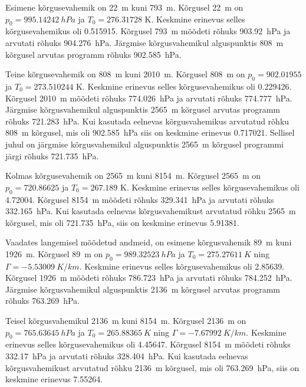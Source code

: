 \documentclass{trkut}%
\begin{document}
Esimene kõrgusevahemik on \SI{22}{m} kuni \SI{793}{m}. Kõrgusel \SI{22}{m} on $p_0=\SI{995.14242}{hPa}$ ja $T_0 = 276.31728$ K. Keskmine erinevus selles kõrgusevahemikus oli \SI{0.515915}{\permil}. Kõrgusel \SI{793}{m} mõõdeti rõhuks \SI{903.92}{hPa} ja arvutati rõhuks \SI{904.276}{hPa}. Järgmise kõrgusvahemikul alguspunktis \SI{808}{m} kõrgusel arvutas programm rõhuks \SI{902.585}{hPa}.

Teine kõrgusevahemik on \SI{808}{m} kuni \SI{2010}{m}. Kõrgusel \SI{808}{m} on $p_0 = 902.01955$ ja $T_0 = 273.510244$ K. Keskmine erinevus selles kõrgusevahemikus oli \SI{0.229426}{\permil}. Kõrgusel \SI{2010}{m} mõõdeti rõhuks \SI{774.026}{hPa} ja arvutati rõhuks \SI{774.777}{hPa}. Järgmise kõrgusvahemikul alguspunktis \SI{2565}{m} kõrgusel arvutas programm rõhuks \SI{721.283}{hPa}. Kui kasutada eelnevas kõrgusvahemikus arvutatud rõhku \SI{808}{m} kõrgusel, mis oli \SI{902.585}{hPa} siis on keskmine erinevus \SI{0.717021}{\permil}. Sellisel juhul on järgmise kõrgusvahemikul alguspunktis \SI{2565}{m} kõrgusel programmi järgi rõhuks \SI{721.735}{hPa}.

Kolmas kõrgusevahemik on \SI{2565}{m} kuni \SI{8154}{m}. Kõrgusel \SI{2565}{m} on $p_0 = 720.86625$ ja $T_0 = 267.189$ K. Keskmine erinevus selles kõrgusevahemikus oli \SI{4.72004}{\permil}. Kõrgusel \SI{8154}{m} mõõdeti rõhuks \SI{329.341}{hPa} ja arvutati rõhuks \SI{332.165}{hPa}. Kui kasutada eelnevas kõrgusvahemikust arvutatud rõhku \SI{2565}{m} kõrgusel, mis oli \SI{721.735}{hPa}, siis on keskmine erinevus \SI{5.91381}{\permil}.

Vaadates langemisel mõõdetud andmeid, on esimene kõrgusvahemik \SI{89}{m} kuni \SI{1926}{m}. Kõrgusel \SI{89}{m} on $p_0=\SI{989.32523}{hPa}$ ja $T_0 = \SI{275.27611}{K}$ ning $\Gamma = \SI{-5.53009}{K/km}$. Keskmine erinevus selles kõrgusevahemikus oli \SI{2.85639}{\permil}. Kõrgusel \SI{1926}{m} mõõdeti rõhuks \SI{786.723}{hPa} ja arvutati rõhuks \SI{784.252}{hPa}. Järgmise kõrgusvahemikul alguspunktis \SI{2136}{m} kõrgusel arvutas programm rõhuks \SI{763.269}{hPa}.

Teisel kõrgusvahemikul \SI{2136}{m} kuni \SI{8154}{m}. Kõrgusel \SI{2136}{m} on $p_0=\SI{765.63645}{hPa}$ ja $T_0 = \SI{265.88365}{K}$ ning $\Gamma = \SI{-7.67992}{K/km}$. Keskmine erinevus selles kõrgusevahemikus oli \SI{4.45647}{\permil}. Kõrgusel \SI{8154}{m} mõõdeti rõhuks \SI{332.17}{hPa} ja arvutati rõhuks \SI{328.404}{hPa}. Kui kasutada eelnevas kõrgusvahemikust arvutatud rõhku \SI{2136}{m} kõrgusel, mis oli \SI{763.269}{hPa}, siis on keskmine erinevus \SI{7.55264}{\permil}.
\end{document}
